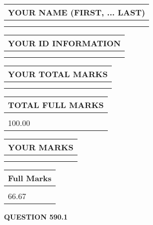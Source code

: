 \documentclass{ctexart}
\begin{document}
   
   
   
\newpage 
\setcounter{page}{ 
   590001 } 
   
   
   
   
\noindent\begin{tabular}{|l|}
\hline
YOUR NAME (FIRST, ... LAST)  \\
\hline
 \\ 
 \\ 
\hline
\end{tabular}
\hspace{0.05in} \begin{tabular}{|l|}
\hline
 YOUR   ID   INFORMATION  \\
\hline
 \\ 
 \\ 
\hline
\end{tabular}
   
   
\vspace{0.2in}\noindent\begin{tabular}{|l|}
\hline
YOUR TOTAL MARKS  \\
\hline
 \\ 
 \\ 
\hline
\end{tabular}
\hspace{0.05in} \begin{tabular}{|l|}
\hline
TOTAL FULL MARKS  \\
\hline
 \\ 
100.00 \\
\hline
\end{tabular}
   
   
 \vspace{0.2in}
 
 
 
 
   
   
  
\vspace{0.2in}
  
\noindent\begin{tabular}{|l|}
\hline
 YOUR MARKS  \\
\hline
 \\ 
 \\ 
\hline
\end{tabular}
\hspace{0.05in} \begin{tabular}{|l|}
\hline
 Full Marks  \\
\hline
 \\ 
66.67 \\
\hline
\end{tabular}
{\textbf{\Large{QUESTION
590.1 
}}}
  
\end{document}
